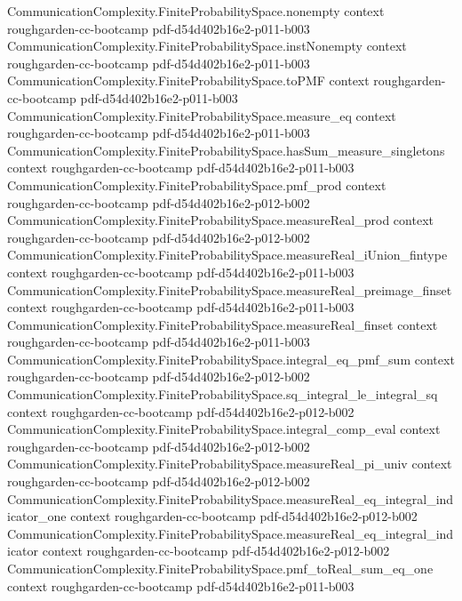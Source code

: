 \begin{theorem}
\proofstep
  {CommunicationComplexity.FiniteProbabilitySpace.nonempty}
  {context}
  {roughgarden-cc-bootcamp}
  {pdf-d54d402b16e2-p011-b003}
\proofstep
  {CommunicationComplexity.FiniteProbabilitySpace.instNonempty}
  {context}
  {roughgarden-cc-bootcamp}
  {pdf-d54d402b16e2-p011-b003}
\proofstep
  {CommunicationComplexity.FiniteProbabilitySpace.toPMF}
  {context}
  {roughgarden-cc-bootcamp}
  {pdf-d54d402b16e2-p011-b003}
\proofstep
  {CommunicationComplexity.FiniteProbabilitySpace.measure_eq}
  {context}
  {roughgarden-cc-bootcamp}
  {pdf-d54d402b16e2-p011-b003}
\proofstep
  {CommunicationComplexity.FiniteProbabilitySpace.hasSum_measure_singletons}
  {context}
  {roughgarden-cc-bootcamp}
  {pdf-d54d402b16e2-p011-b003}
\proofstep
  {CommunicationComplexity.FiniteProbabilitySpace.pmf_prod}
  {context}
  {roughgarden-cc-bootcamp}
  {pdf-d54d402b16e2-p012-b002}
\proofstep
  {CommunicationComplexity.FiniteProbabilitySpace.measureReal_prod}
  {context}
  {roughgarden-cc-bootcamp}
  {pdf-d54d402b16e2-p012-b002}
\proofstep
  {CommunicationComplexity.FiniteProbabilitySpace.measureReal_iUnion_fintype}
  {context}
  {roughgarden-cc-bootcamp}
  {pdf-d54d402b16e2-p011-b003}
\proofstep
  {CommunicationComplexity.FiniteProbabilitySpace.measureReal_preimage_finset}
  {context}
  {roughgarden-cc-bootcamp}
  {pdf-d54d402b16e2-p011-b003}
\proofstep
  {CommunicationComplexity.FiniteProbabilitySpace.measureReal_finset}
  {context}
  {roughgarden-cc-bootcamp}
  {pdf-d54d402b16e2-p011-b003}
\proofstep
  {CommunicationComplexity.FiniteProbabilitySpace.integral_eq_pmf_sum}
  {context}
  {roughgarden-cc-bootcamp}
  {pdf-d54d402b16e2-p012-b002}
\proofstep
  {CommunicationComplexity.FiniteProbabilitySpace.sq_integral_le_integral_sq}
  {context}
  {roughgarden-cc-bootcamp}
  {pdf-d54d402b16e2-p012-b002}
\proofstep
  {CommunicationComplexity.FiniteProbabilitySpace.integral_comp_eval}
  {context}
  {roughgarden-cc-bootcamp}
  {pdf-d54d402b16e2-p012-b002}
\proofstep
  {CommunicationComplexity.FiniteProbabilitySpace.measureReal_pi_univ}
  {context}
  {roughgarden-cc-bootcamp}
  {pdf-d54d402b16e2-p012-b002}
\proofstep
  {CommunicationComplexity.FiniteProbabilitySpace.measureReal_eq_integral_indicator_one}
  {context}
  {roughgarden-cc-bootcamp}
  {pdf-d54d402b16e2-p012-b002}
\proofstep
  {CommunicationComplexity.FiniteProbabilitySpace.measureReal_eq_integral_indicator}
  {context}
  {roughgarden-cc-bootcamp}
  {pdf-d54d402b16e2-p012-b002}
\proofstep
  {CommunicationComplexity.FiniteProbabilitySpace.pmf_toReal_sum_eq_one}
  {context}
  {roughgarden-cc-bootcamp}
  {pdf-d54d402b16e2-p011-b003}

\end{theorem}
